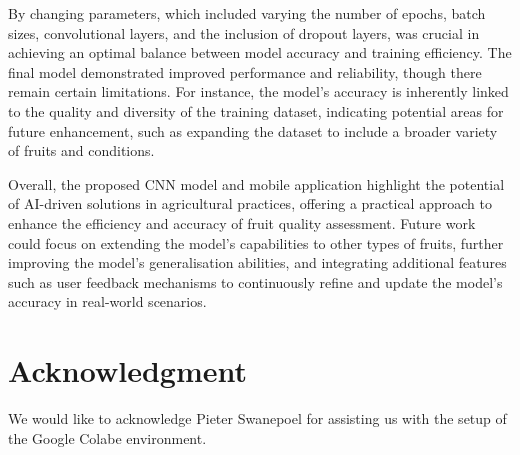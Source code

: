 \documentclass[conference]{IEEEtran}
\begin{document}
By changing parameters, which included varying the number of epochs, batch sizes, convolutional layers, and the inclusion of dropout layers, was crucial in achieving an optimal balance between model accuracy and training efficiency. The final model demonstrated improved performance and reliability, though there remain certain limitations. For instance, the model's accuracy is inherently linked to the quality and diversity of the training dataset, indicating potential areas for future enhancement, such as expanding the dataset to include a broader variety of fruits and conditions.

Overall, the proposed CNN model and mobile application highlight the potential of AI-driven solutions in agricultural practices, offering a practical approach to enhance the efficiency and accuracy of fruit quality assessment. Future work could focus on extending the model's capabilities to other types of fruits, further improving the model's generalisation abilities, and integrating additional features such as user feedback mechanisms to continuously refine and update the model's accuracy in real-world scenarios.

\section*{Acknowledgment}

We would like to acknowledge Pieter Swanepoel for assisting us with the setup of the Google Colabe environment.
\end{document}
